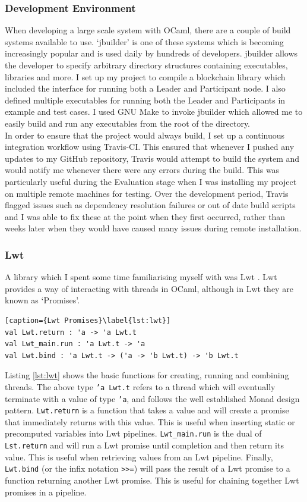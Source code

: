 \documentclass[12pt,a4paper,twoside,openright]{report}
\begin{document}
		\subsubsection*{Development Environment}
		When developing a large scale system with OCaml, there are a couple of build systems available to use. 
		`jbuilder' \cite{jbuilder} is one of these systems which is becoming increasingly popular and is used daily by hundreds of developers.
		jbuilder allows the developer to specify arbitrary directory structures containing executables, libraries and more.
		I set up my project to compile a blockchain library which included the interface for running both a Leader and Participant node. 
		I also defined multiple executables for running both the Leader and Participants in example and test cases. 
		I used GNU Make \cite{GNUMake} to invoke jbuilder which allowed me to easily build and run any executables from the root of the directory.\\
		
		In order to ensure that the project would always build, I set up a continuous integration workflow using Travis-CI. 
		This ensured that whenever I pushed any updates to my GitHub repository, Travis would attempt to build the system and would notify me whenever there were any errors during the build.
		This was particularly useful during the Evaluation stage when I was installing my project on multiple remote machines for testing.
		Over the development period, Travis flagged issues such as dependency resolution failures or out of date build scripts and I was able to fix these at the point when they first occurred, rather than weeks later when they would have caused many issues during remote installation.

	\subsubsection*{Lwt}
		A library which I spent some time familiarising myself with was Lwt \cite{Lwt}. 
		Lwt provides a way of interacting with threads in OCaml, although in Lwt they are known as `Promises'.
		\begin{lstlisting}[caption={Lwt Promises}\label{lst:lwt}]
val Lwt.return : 'a -> 'a Lwt.t 
val Lwt_main.run : 'a Lwt.t -> 'a
val Lwt.bind : 'a Lwt.t -> ('a -> 'b Lwt.t) -> 'b Lwt.t
		\end{lstlisting}
		Listing \ref{lst:lwt} shows the basic functions for creating, running and combining threads.
		The above type \texttt{'a Lwt.t} refers to a thread which will eventually terminate with a value of type \texttt{'a}, and follows the well established Monad design pattern.
		\texttt{Lwt.return} is a function that takes a value and will create a promise that immediately returns with this value.
		This is useful when inserting static or precomputed variables into Lwt pipelines.
		\texttt{Lwt\_main.run} is the dual of \texttt{Lst.return} and will run a Lwt promise until completion and then return its value.
		This is useful when retrieving values from an Lwt pipeline.
		Finally, \texttt{Lwt.bind} (or the infix notation \texttt{>>=}) will pass the result of a Lwt promise to a function returning another Lwt promise.
		This is useful for chaining together Lwt promises in a pipeline.
\end{document}
